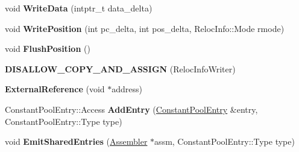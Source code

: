 \begin{DoxyCompactItemize}
\item 
void {\bfseries Write\+Data} (intptr\+\_\+t data\+\_\+delta)\hypertarget{classv8_1_1internal_1_1_b_a_s_e___e_m_b_e_d_d_e_d_aae8d3142f15d10a7468434c98f285802}{}\label{classv8_1_1internal_1_1_b_a_s_e___e_m_b_e_d_d_e_d_aae8d3142f15d10a7468434c98f285802}

\item 
void {\bfseries Write\+Position} (int pc\+\_\+delta, int pos\+\_\+delta, Reloc\+Info\+::\+Mode rmode)\hypertarget{classv8_1_1internal_1_1_b_a_s_e___e_m_b_e_d_d_e_d_a36229f8c735fd6bdca02bdaf6179c6d3}{}\label{classv8_1_1internal_1_1_b_a_s_e___e_m_b_e_d_d_e_d_a36229f8c735fd6bdca02bdaf6179c6d3}

\item 
void {\bfseries Flush\+Position} ()\hypertarget{classv8_1_1internal_1_1_b_a_s_e___e_m_b_e_d_d_e_d_a3af948ece909182b63ee41b9f8f8a9b1}{}\label{classv8_1_1internal_1_1_b_a_s_e___e_m_b_e_d_d_e_d_a3af948ece909182b63ee41b9f8f8a9b1}

\item 
{\bfseries D\+I\+S\+A\+L\+L\+O\+W\+\_\+\+C\+O\+P\+Y\+\_\+\+A\+N\+D\+\_\+\+A\+S\+S\+I\+GN} (Reloc\+Info\+Writer)\hypertarget{classv8_1_1internal_1_1_b_a_s_e___e_m_b_e_d_d_e_d_ab0b471d6a3065ccc351b946f824408fc}{}\label{classv8_1_1internal_1_1_b_a_s_e___e_m_b_e_d_d_e_d_ab0b471d6a3065ccc351b946f824408fc}

\item 
{\bfseries External\+Reference} (void $\ast$address)\hypertarget{classv8_1_1internal_1_1_b_a_s_e___e_m_b_e_d_d_e_d_ab7eea5456fdc77119abc65e8f60ddf58}{}\label{classv8_1_1internal_1_1_b_a_s_e___e_m_b_e_d_d_e_d_ab7eea5456fdc77119abc65e8f60ddf58}

\item 
Constant\+Pool\+Entry\+::\+Access {\bfseries Add\+Entry} (\hyperlink{classv8_1_1internal_1_1_constant_pool_entry}{Constant\+Pool\+Entry} \&entry, Constant\+Pool\+Entry\+::\+Type type)\hypertarget{classv8_1_1internal_1_1_b_a_s_e___e_m_b_e_d_d_e_d_a899fba6c8b02643553f7cf6e93d8367b}{}\label{classv8_1_1internal_1_1_b_a_s_e___e_m_b_e_d_d_e_d_a899fba6c8b02643553f7cf6e93d8367b}

\item 
void {\bfseries Emit\+Shared\+Entries} (\hyperlink{classv8_1_1internal_1_1_assembler}{Assembler} $\ast$assm, Constant\+Pool\+Entry\+::\+Type type)\hypertarget{classv8_1_1internal_1_1_b_a_s_e___e_m_b_e_d_d_e_d_aedaee74e722bcc00c97091bb38b9ce8c}{}\label{classv8_1_1internal_1_1_b_a_s_e___e_m_b_e_d_d_e_d_aedaee74e722bcc00c97091bb38b9ce8c}


\end{DoxyCompactItemize}
